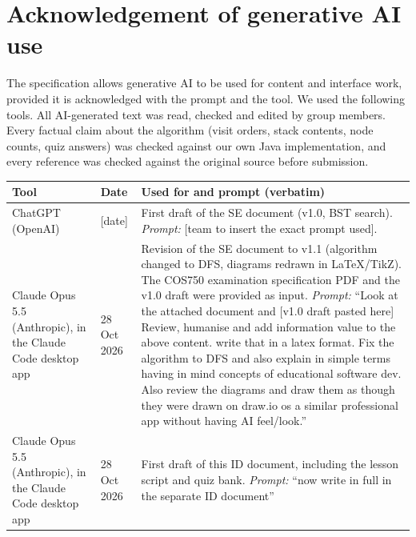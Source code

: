 \documentclass[11pt,a4paper]{article}
\begin{document}
\section{Acknowledgement of generative AI use}
\label{app:genai}

The specification allows generative AI to be used for content and interface work, provided it is
acknowledged with the prompt and the tool. We used the following tools. All AI-generated text was
read, checked and edited by group members. Every factual claim about the algorithm (visit orders,
stack contents, node counts, quiz answers) was checked against our own Java implementation, and
every reference was checked against the original source before submission.

\begin{longtable}{@{}p{3.2cm} p{2.4cm} p{9.2cm}@{}}
  \toprule
  \textbf{Tool} & \textbf{Date} & \textbf{Used for and prompt (verbatim)} \\
  \midrule
  \endhead
  ChatGPT (OpenAI) & [date] & First draft of the SE document (v1.0, BST search).\newline
      \emph{Prompt:} [team to insert the exact prompt used]. \\
  Claude Opus 5.5 (Anthropic), in the Claude Code desktop app & 28 Oct 2026 &
      Revision of the SE document to v1.1 (algorithm changed to DFS, diagrams redrawn in LaTeX/TikZ).
      The COS750 examination specification PDF and the v1.0 draft were provided as input.\newline
      \emph{Prompt:} ``Look at the attached document and [v1.0 draft pasted here] Review, humanise
      and add information value to the above content. write that in a latex format. Fix the
      algorithm to DFS and also explain in simple terms having in mind concepts of educational
      software dev. Also review the diagrams and draw them as though they were drawn on draw.io os
      a similar professional app without having AI feel/look.'' \\
  Claude Opus 5.5 (Anthropic), in the Claude Code desktop app & 28 Oct 2026 &
      First draft of this ID document, including the lesson script and quiz bank.\newline
      \emph{Prompt:} ``now write in full in the separate ID document'' \\
  \bottomrule
\end{longtable}
\end{document}
